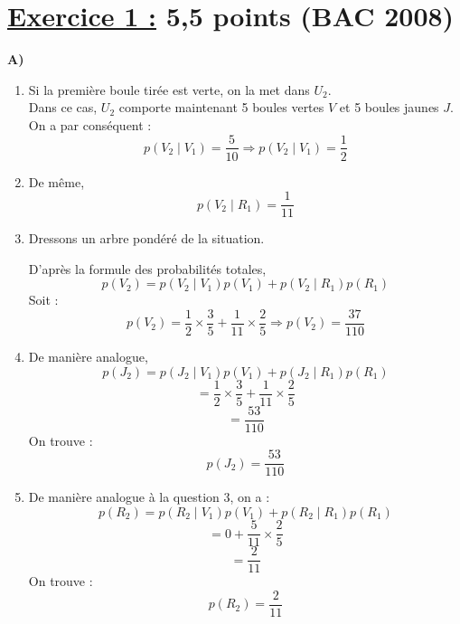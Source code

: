 \documentclass[12pt,a4paper]{article}
\begin{document}
\section*{\underline{Exercice 1 :} 5,5 points (BAC 2008)}
\textbf{A)} 
\begin{enumerate}
    \item Si la première boule tirée est verte, on la met dans $U_2$.\\
Dans ce cas, $U_2$ comporte maintenant 5 boules vertes $V$ et 5 boules jaunes $J$.\\
On a par conséquent : 
\[
p(V_2 \mid V_1) = \frac{5}{10} \Rightarrow p(V_2 \mid V_1) = \frac{1}{2}
\]

\item  De même,
\[
p(V_2 \mid R_1) = \frac{1}{11}
\]

\item  Dressons un arbre pondéré de la situation.


D'après la formule des probabilités totales, 
\[
p(V_2) = p(V_2 \mid V_1) p(V_1) + p(V_2 \mid R_1) p(R_1)
\]
Soit :
\[
p(V_2) = \frac{1}{2} \times \frac{3}{5} + \frac{1}{11} \times \frac{2}{5} \Rightarrow p(V_2) = \frac{37}{110}
\]

\item  De manière analogue,
\[
p(J_2) = p(J_2 \mid V_1) p(V_1) + p(J_2 \mid R_1) p(R_1)
\]
\[
= \frac{1}{2} \times \frac{3}{5} + \frac{1}{11} \times \frac{2}{5}
\]
\[
= \frac{53}{110}
\]
On trouve :
\[
p(J_2) = \frac{53}{110}
\]

\item  De manière analogue à la question 3, on a :
\[
p(R_2) = p(R_2 \mid V_1) p(V_1) + p(R_2 \mid R_1) p(R_1)
\]
\[
= 0 + \frac{5}{11} \times \frac{2}{5}
\]
\[
= \frac{2}{11}
\]
On trouve :
\[
p(R_2) = \frac{2}{11}
\]
\end{enumerate}
\end{document}

